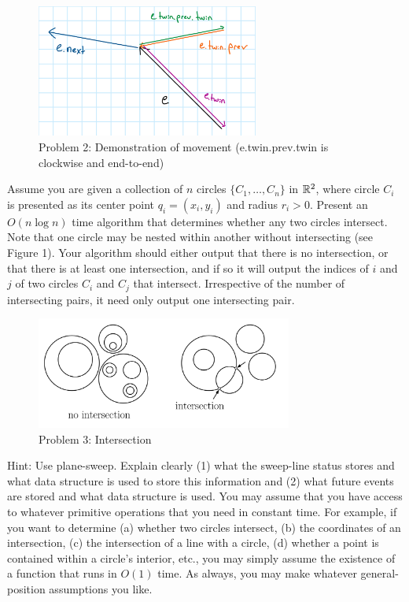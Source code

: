 \documentclass[11pt]{article}
\begin{document}
\begin{figure}[h]
    \centering
    \includegraphics[width = 0.65\textwidth]{prob2_move}
    \caption{Problem 2: Demonstration of movement (e.twin.prev.twin is clockwise and end-to-end)}
\end{figure}



Assume you are given a collection of $n$ circles $\{C_1 , \ldots , C_n \}$ in
$\mathbb{R}^2$, where circle $C_i$ is presented as its center point $q_i = (x_i, y_i)$
and radius $r_i > 0$. Present an $O(n \log n)$ time algorithm that determines
whether any two circles intersect. Note that one circle may be nested within
another without intersecting (see Figure 1). Your algorithm should either output
that there is no intersection, or that there is at least one intersection, and
if so it will output the indices of $i$ and $j$ of two circles $C_i$ and $C_j$
that intersect. Irrespective of the number of intersecting pairs, it need only
output one intersecting pair.

\begin{figure}[h]
    \centering
    \includegraphics[width=0.75\textwidth]{intersection}
    \caption{Problem 3: Intersection}
\end{figure}

Hint: Use plane-sweep. Explain clearly (1) what the sweep-line status stores and
what data structure is used to store this information and (2) what future events
are stored and what data structure is used. You may assume that you have access
to whatever primitive operations that you need in constant time. For example, if
you want to determine (a) whether two circles intersect, (b) the coordinates of
an intersection, (c) the intersection of a line with a circle, (d) whether a
point is contained within a circle's interior, etc., you may simply assume the
existence of a function that runs in $O(1)$ time. As always, you may make
whatever general-position assumptions you like.
\end{document}
